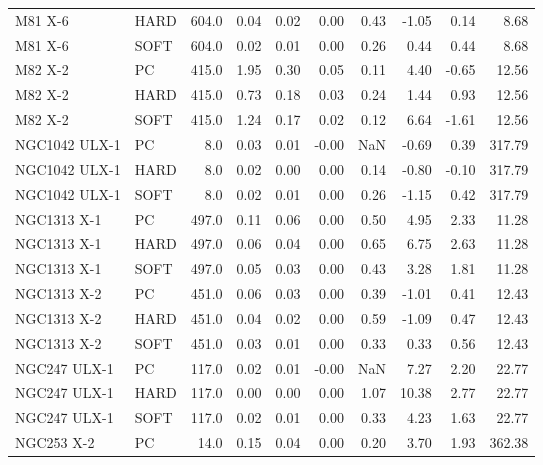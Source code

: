 \begin{tabular}{llrrrrrrrr}
           M81 X-6 &  HARD &  604.0 &  0.04 & 0.02 &      0.00 &   0.43 &     -1.05 &  0.14 &         8.68 \\
           M81 X-6 &  SOFT &  604.0 &  0.02 & 0.01 &      0.00 &   0.26 &      0.44 &  0.44 &         8.68 \\
           M82 X-2 &    PC &  415.0 &  1.95 & 0.30 &      0.05 &   0.11 &      4.40 & -0.65 &        12.56 \\
           M82 X-2 &  HARD &  415.0 &  0.73 & 0.18 &      0.03 &   0.24 &      1.44 &  0.93 &        12.56 \\
           M82 X-2 &  SOFT &  415.0 &  1.24 & 0.17 &      0.02 &   0.12 &      6.64 & -1.61 &        12.56 \\
     NGC1042 ULX-1 &    PC &    8.0 &  0.03 & 0.01 &     -0.00 &    NaN &     -0.69 &  0.39 &       317.79 \\
     NGC1042 ULX-1 &  HARD &    8.0 &  0.02 & 0.00 &      0.00 &   0.14 &     -0.80 & -0.10 &       317.79 \\
     NGC1042 ULX-1 &  SOFT &    8.0 &  0.02 & 0.01 &      0.00 &   0.26 &     -1.15 &  0.42 &       317.79 \\
       NGC1313 X-1 &    PC &  497.0 &  0.11 & 0.06 &      0.00 &   0.50 &      4.95 &  2.33 &        11.28 \\
       NGC1313 X-1 &  HARD &  497.0 &  0.06 & 0.04 &      0.00 &   0.65 &      6.75 &  2.63 &        11.28 \\
       NGC1313 X-1 &  SOFT &  497.0 &  0.05 & 0.03 &      0.00 &   0.43 &      3.28 &  1.81 &        11.28 \\
       NGC1313 X-2 &    PC &  451.0 &  0.06 & 0.03 &      0.00 &   0.39 &     -1.01 &  0.41 &        12.43 \\
       NGC1313 X-2 &  HARD &  451.0 &  0.04 & 0.02 &      0.00 &   0.59 &     -1.09 &  0.47 &        12.43 \\
       NGC1313 X-2 &  SOFT &  451.0 &  0.03 & 0.01 &      0.00 &   0.33 &      0.33 &  0.56 &        12.43 \\
      NGC247 ULX-1 &    PC &  117.0 &  0.02 & 0.01 &     -0.00 &    NaN &      7.27 &  2.20 &        22.77 \\
      NGC247 ULX-1 &  HARD &  117.0 &  0.00 & 0.00 &      0.00 &   1.07 &     10.38 &  2.77 &        22.77 \\
      NGC247 ULX-1 &  SOFT &  117.0 &  0.02 & 0.01 &      0.00 &   0.33 &      4.23 &  1.63 &        22.77 \\
        NGC253 X-2 &    PC &   14.0 &  0.15 & 0.04 &      0.00 &   0.20 &      3.70 &  1.93 &       362.38 \\

\end{tabular}

